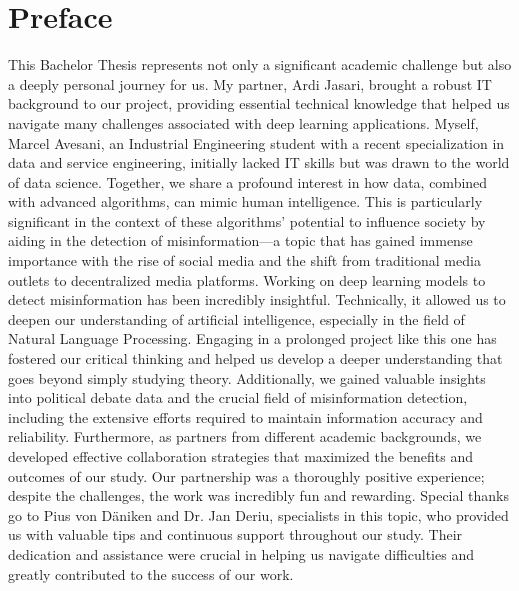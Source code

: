 \newpage
\thispagestyle{empty}
\section*{Preface}
This Bachelor Thesis represents not only a significant academic challenge but also a deeply personal journey for us. My partner, Ardi Jasari, brought a robust IT background to our project, providing essential technical knowledge that helped us navigate many challenges associated with deep learning applications. Myself, Marcel Avesani, an Industrial Engineering student with a recent specialization in data and service engineering, initially lacked IT skills but was drawn to the world of data science. Together, we share a profound interest in how data, combined with advanced algorithms, can mimic human intelligence. This is particularly significant in the context of these algorithms' potential to influence society by aiding in the detection of misinformation—a topic that has gained immense importance with the rise of social media and the shift from traditional media outlets to decentralized media platforms.
Working on deep learning models to detect misinformation has been incredibly insightful. Technically, it allowed us to deepen our understanding of artificial intelligence, especially in the field of Natural Language Processing. Engaging in a prolonged project like this one has fostered our critical thinking and helped us develop a deeper understanding that goes beyond simply studying theory. Additionally, we gained valuable insights into political debate data and the crucial field of misinformation detection, including the extensive efforts required to maintain information accuracy and reliability.
Furthermore, as partners from different academic backgrounds, we developed effective collaboration strategies that maximized the benefits and outcomes of our study. Our partnership was a thoroughly positive experience; despite the challenges, the work was incredibly fun and rewarding.
Special thanks go to Pius von Däniken and Dr. Jan Deriu, specialists in this topic, who provided us with valuable tips and continuous support throughout our study. Their dedication and assistance were crucial in helping us navigate difficulties and greatly contributed to the success of our work.
